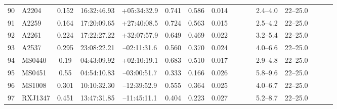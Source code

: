 \documentclass[useAMS,usenatbib]{mnras}
\begin{document}
\begin{table}
\begin{tabular*}{1.0\textwidth}{ l l c c c r c c c c c c c c c c }
90 & A2204 & 0.152 & 16:32:46.93 & +05:34:32.9 & 0.741 & 0.586 & 0.014 \hspace{8pt}& & & \hspace{8pt}& 2.4--4.0 \hspace{8pt}& 22--25.0 \\
91 & A2259 & 0.164 & 17:20:09.65 & +27:40:08.5 & 0.724 & 0.563 & 0.015 \hspace{8pt}& & & \hspace{8pt}& 2.5--4.2 \hspace{8pt}& 22--25.0 \\
92 & A2261 & 0.224 & 17:22:27.22 & +32:07:57.9 & 0.649 & 0.469 & 0.022 \hspace{8pt}& & & \hspace{8pt}& 3.2--5.4 \hspace{8pt}& 22--25.0 \\
93 & A2537 & 0.295 & 23:08:22.21 & \hspace{1.5pt}--\hspace{0.5pt}02:11:31.6 & 0.560 & 0.370 & 0.024 \hspace{8pt}& & & \hspace{8pt}& 4.0--6.6 \hspace{8pt}& 22--25.0 \\
94 & MS0440 & 0.19 & 04:43:09.92 & +02:10:19.1 & 0.683 & 0.510 & 0.017 \hspace{8pt}& & & \hspace{8pt}& 2.9--4.8 \hspace{8pt}& 22--25.0 \\
95 & MS0451 & 0.55 & 04:54:10.83 & \hspace{1.5pt}--\hspace{0.5pt}03:00:51.7 & 0.333 & 0.166 & 0.026 \hspace{8pt}& & & \hspace{8pt}& 5.8--9.6 \hspace{8pt}& 22--25.0 \\
96 & MS1008 & 0.301 & 10:10:32.30 & \hspace{1.5pt}--\hspace{0.5pt}12:39:52.9 & 0.555 & 0.364 & 0.025 \hspace{8pt}& & & \hspace{8pt}& 4.0--6.7 \hspace{8pt}& 22--25.0 \\
97 & RXJ1347 & 0.451 & 13:47:31.85 & \hspace{1.5pt}--\hspace{0.5pt}11:45:11.1 & 0.404 & 0.223 & 0.027 \hspace{8pt}& & & \hspace{8pt}& 5.2--8.7 \hspace{8pt}& 22--25.0 \\

\end{tabular*}
\end{table}
\end{document}
